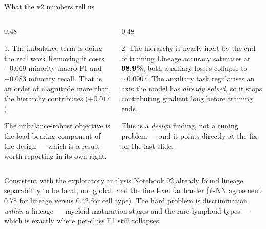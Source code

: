 \documentclass[aspectratio=169,11pt]{beamer}
\newcommand{\bad}[1]{\textcolor{red!70!black}{\textbf{#1}}}
\begin{document}
\begin{frame}{What the v2 numbers tell us}
  \small
  \begin{columns}[T]
    \begin{column}{0.48\textwidth}
      \begin{block}{1. The imbalance term is doing the real work}
        \scriptsize
        Removing it costs \bad{$-0.069$} minority macro F1 and \bad{$-0.083$}
        minority recall. That is an order of magnitude more than the hierarchy
        contributes ($+0.017$).

        \smallskip
        The imbalance-robust objective is the load-bearing component of the
        design --- which is a result worth reporting in its own right.
      \end{block}
    \end{column}
    \begin{column}{0.48\textwidth}
      \begin{alertblock}{2. The hierarchy is nearly inert by the end of training}
        \scriptsize
        Lineage accuracy saturates at \textbf{98.9\%}; both auxiliary losses
        collapse to ${\sim}0.0007$. The auxiliary task regularises an axis the
        model has \emph{already solved}, so it stops contributing gradient long
        before training ends.

        \smallskip
        This is a \emph{design} finding, not a tuning problem --- and it points
        directly at the fix on the last slide.
      \end{alertblock}
    \end{column}
  \end{columns}

  \vspace{0.6em}
  \begin{exampleblock}{Consistent with the exploratory analysis}
    \scriptsize
    Notebook 02 already found lineage separability to be local, not global, and
    the fine level far harder ($k$-NN agreement $0.78$ for lineage versus
    $0.42$ for cell type). The hard problem is discrimination \emph{within} a
    lineage --- myeloid maturation stages and the rare lymphoid types --- which
    is exactly where per-class F1 still collapses.
  \end{exampleblock}
\end{frame}
\end{document}
